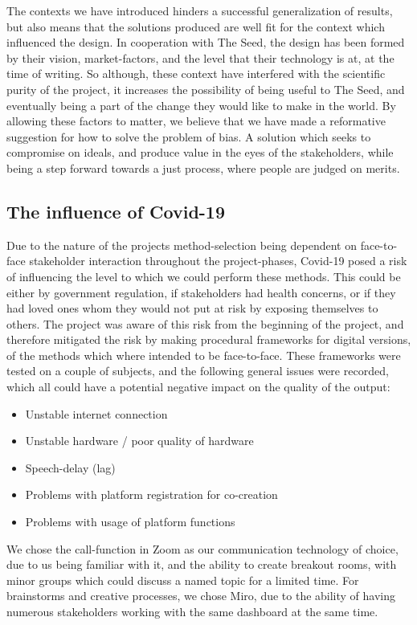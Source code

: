 The contexts we have introduced hinders a successful generalization of results, but also means that the solutions produced are well fit for the context which influenced the design. In cooperation with The Seed, the design has been formed by their vision, market-factors, and the level that their technology is at, at the time of writing. So although, these context have interfered with the scientific purity of the project, it increases the possibility of being useful to The Seed, and eventually being a part of the change they would like to make in the world. By allowing these factors to matter, we believe that we have made a reformative suggestion for how to solve the problem of bias. A solution which seeks to compromise on ideals, and produce value in the eyes of the stakeholders, while being a step forward towards a just process, where people are judged on merits. 

\subsection{The influence of Covid-19}
Due to the nature of the projects method-selection being dependent on face-to-face stakeholder interaction throughout the project-phases, Covid-19 posed a risk of influencing the level to which we could perform these methods. This could be either by government regulation, if stakeholders had health concerns, or if they had loved ones whom they would not put at risk by exposing themselves to others. The project was aware of this risk from the beginning of the project, and therefore mitigated the risk by making procedural frameworks for digital versions, of the methods which where intended to be face-to-face. These frameworks were tested on a couple of subjects, and the following general issues were recorded, which all could have a potential negative impact on the quality of the output:

\begin{itemize}
    \item Unstable internet connection
    \item Unstable hardware / poor quality of hardware
    \item Speech-delay (lag)
    \item Problems with platform registration for co-creation
    \item Problems with usage of platform functions
\end{itemize}

We chose the call-function in Zoom as our communication technology of choice, due to us being familiar with it, and the ability to create breakout rooms, with minor groups which could discuss a named topic for a limited time. For brainstorms and creative processes, we chose Miro, due to the ability of having numerous stakeholders working with the same dashboard at the same time. \\

